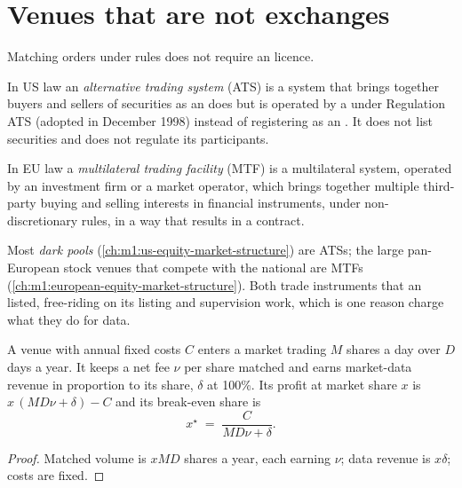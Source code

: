 \section{Venues that are not exchanges}

Matching orders under rules does not require an  licence.

\begin{definition}\label{def:m1:exchanges-brokers-venues:ats}
In US law an \emph{alternative trading system}
(ATS) is a system that brings together buyers and sellers of securities as an
 does but is operated by a  under Regulation ATS
(adopted in December 1998) instead of registering as an . It does not
list securities and does not regulate its participants.
\end{definition}

\begin{definition}\label{def:m1:exchanges-brokers-venues:mtf}
In EU law a \emph{multilateral trading facility}
(MTF) is a multilateral system, operated by an investment firm or a market
operator, which brings together multiple third-party buying and selling
interests in financial instruments, under non-discretionary rules, in a way
that results in a contract.
\end{definition}

Most \emph{dark pools} (\cref{ch:m1:us-equity-market-structure}) are ATSs;
the large pan-European stock venues that compete with the national 
are MTFs (\cref{ch:m1:european-equity-market-structure}). Both trade
instruments that an  listed, free-riding on its listing and
supervision work, which is one reason  charge what they do for
data.

\begin{proposition}\label{prop:m1:exchanges-brokers-venues:breakeven}
A venue with annual fixed costs $C$ enters a market trading $M$ shares a day
over $D$ days a year. It keeps a net fee $\nu$ per share matched and earns
market-data revenue in proportion to its share, $\delta$ at 100\%. Its
profit at market share $x$ is $x\,(M D \nu + \delta) - C$ and its break-even
share is
\[
x^\star \;=\; \frac{C}{M D \nu + \delta}.
\]
\end{proposition}
\begin{proof}
Matched volume is $xMD$ shares a year, each earning $\nu$; data revenue is
$x\delta$; costs are fixed.
\end{proof}

